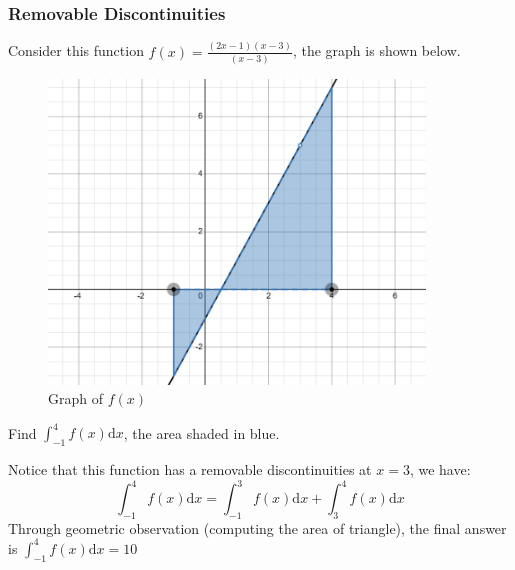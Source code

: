 \documentclass{article}
\begin{document}
\subsubsection{Removable Discontinuities}
Consider this function $\displaystyle f(x) = \frac{(2x-1)(x-3)}{(x-3)}$, the graph is shown below.
\begin{figure}[H]
    \centering
    \includegraphics[width=10cm]{remove.png}
    \caption{Graph of $f(x)$}
\end{figure}
Find $\displaystyle \int_{-1}^{4} f(x)\mathrm{d}x$, the area shaded in blue.

Notice that this function has a removable discontinuities at $x=3$, we have:
\[
\int_{-1}^{4} f(x)\mathrm{d}x = \int_{-1}^{3}f(x)\mathrm{d}x + \int_{3}^{4}f(x)\mathrm{d}x
\]
Through geometric observation (computing the area of triangle), the final answer is $\displaystyle \int_{-1}^{4}f(x)\mathrm{d}x = 10$
\end{document}
